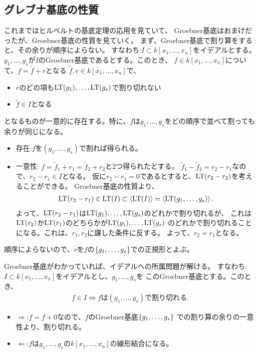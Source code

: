 \documentclass[9pt]{ltjsarticle}
\begin{document}
\subsection{グレブナ基底の性質}
\label{sub:グレブナ基底の性質}
これまではヒルベルトの基底定理の応用を見ていて、
Groebner基底はおまけだったが、Groebner基底の性質を見ていく。
まず、Groebner基底で割り算をすると、その余りが順序によらない。
すなわち:$I\subset k[x_1,\dots,x_n]$をイデアルとする。
$g_1,\dots,g_s$が$I$のGroebner基底であるとする。このとき、
$f\in k[x_1,\dots,x_n]$について、$f=\tilde f + r$となる
$\tilde f,r \in k[x_1,\dots,x_n]$で、
\begin{itemize}
  \item $r$のどの項も${\rm LT}(g_1),\dots,{\rm LT}(g_s)$で割り切れない
  \item $\tilde f \in I$となる
\end{itemize}
となるものが一意的に存在する。特に、$f$は$g_1,\dots,g_s$をどの順序で並べて割っても余りが同じになる。
\begin{myproof}
  \begin{itemize}
    \item 存在:$f$を$(g_1,\dots,g_s)$で割れば得られる。
    \item 一意性: $f=\tilde f_1 + r_1 = \tilde f_2 + r_2$と2つ得られたとする。
    $\tilde f_1 - \tilde f_2 = r_2 - r_1$なので、$r_2 - r_1 \in I$となる。
    仮に$r_2 - r_1 = 0$であるとすると、${\rm LT}(r_2-r_2)$を考えることができる。
    Groebner基底の性質より、
    \begin{align}
      {\rm LT}(r_2-r_1) \in {\rm LT}(I) \subset \left\langle {\rm LT}(I) \right\rangle
      =
       \left\langle {\rm LT}(g_1,\dots,g_s) \right\rangle.
    \end{align}
    よって、${\rm LT}(r_2-r_1)$は${\rm LT}(g_1),\dots,{\rm LT}(g_s)$のどれかで割り切れるが、
    これは${\rm LT}(r_2)$か${\rm LT}(r_1)$のどちらかが${\rm LT}(g_1),\dots,{\rm LT}(g_s)$
    のどれかで割り切れることになる。これは、$r_1,r_2$に課した条件に反する。
    よって、$r_2 =r_1$となる。
  \end{itemize}
\end{myproof}

順序によらないので、$r$を$f$の$\left\{g_1,\dots,g_s\right\}$での正規形とよぶ。

Groebner基底がわかっていれば、イデアルへの所属問題が解ける。
すなわち:$I\subset k[x_1,\dots,x_n]$をイデアルとし、$g_1,\dots,g_s$を
このGroebner基底とする。このとき、
\begin{align}
  f \in I \iff f は (g_1,\dots,g_s) で割り切れる .
\end{align}
\begin{myproof}
  \begin{itemize}
    \item $\Rightarrow$:$f=f+0$なので、$f$のGroebner基底$\left\{g_1,\dots,g_s\right\}$
    での割り算の余りの一意性より、割り切れる。
    \item $\Leftarrow$:$f$は$g_1,\dots,g_s$の$k[x_1,\dots,x_n]$の線形結合になる。
  \end{itemize}
\end{myproof}
\end{document}
